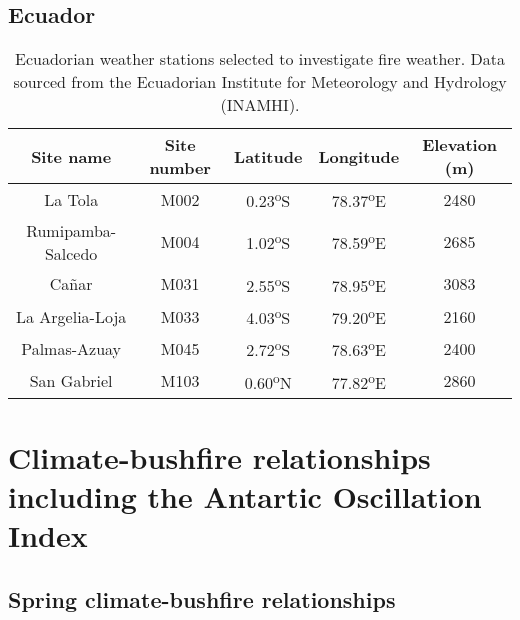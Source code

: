 \section{Ecuador}

\begin{table}[h]
\noindent \begin{centering}
\caption[Ecuadorian weather stations selected to investigate fire
weather]{Ecuadorian weather stations selected to investigate fire
weather. Data sourced from the Ecuadorian Institute for Meteorology
and Hydrology (INAMHI). \label{tab:Table-1:Ecuadorian weather stations selected to investigate fire weather}}

\par\end{centering}

\noindent \centering{}%
\begin{tabular}{|c|c|c|c|c|}
\hline 
\textbf{Site name} & \textbf{Site number} & \textbf{Latitude} & \textbf{Longitude} & \textbf{Elevation (m)}\tabularnewline
\hline 
\hline 
La Tola & M002 & 0.23\textsuperscript{o}S & 78.37\textsuperscript{o}E & 2480\tabularnewline
\hline 
Rumipamba-Salcedo & M004 & 1.02\textsuperscript{o}S & 78.59\textsuperscript{o}E & 2685\tabularnewline
\hline 
Ca\~nar & M031 & 2.55\textsuperscript{o}S & 78.95\textsuperscript{o}E & 3083\tabularnewline
\hline 
La Argelia-Loja & M033 & 4.03\textsuperscript{o}S & 79.20\textsuperscript{o}E & 2160\tabularnewline
\hline 
Palmas-Azuay & M045 & 2.72\textsuperscript{o}S & 78.63\textsuperscript{o}E & 2400\tabularnewline
\hline 
San Gabriel & M103 & 0.60\textsuperscript{o}N & 77.82\textsuperscript{o}E & 2860\tabularnewline
\hline 
\end{tabular}
\end{table}



\chapter{Climate-bushfire relationships including the Antartic Oscillation
Index }

\newpage{}


\section{Spring climate-bushfire relationships}

